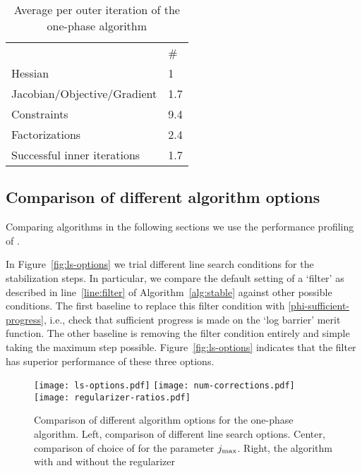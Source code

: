 \documentclass{article}
\begin{document}
\begin{table}[H]
\begin{tabular}{l  l}
&   \# \\ 
Hessian & 1 \\  
Jacobian/Objective/Gradient & 1.7 \\
Constraints & 9.4 \\
Factorizations & 2.4 \\
Successful inner iterations & 1.7 \\
\end{tabular}
\caption{Average per outer iteration of the one-phase algorithm}
\end{table}




\subsection{Comparison of different algorithm options}\label{alg:comparison-options}

Comparing algorithms in the following sections we use the performance profiling of \cite{dolan2002benchmarking}.



In Figure~\ref{fig:ls-options} we trial different line search conditions for the stabilization steps. In particular, we compare the default setting of a `filter' as described in line~\ref{line:filter} of Algorithm~\ref{alg:stable} against other possible conditions. The first baseline to replace this filter condition with  \eqref{phi-sufficient-progress}, i.e., check that sufficient progress is made on the `log barrier' merit function. The other baseline is removing the filter condition entirely and simple taking the maximum step possible. Figure~\ref{fig:ls-options} indicates that the filter has superior performance of these three options.

\begin{figure}[H]
\texttt{[image: ls-options.pdf]}
\texttt{[image: num-corrections.pdf]}
\texttt{[image: regularizer-ratios.pdf]}
\caption{Comparison of different algorithm options for the one-phase algorithm. Left, comparison of different line search options. Center, comparison of choice of for the parameter $j_{\max}$. Right, the algorithm with and without the regularizer}
\label{fig:alg-options}
\end{figure}
\end{document}
